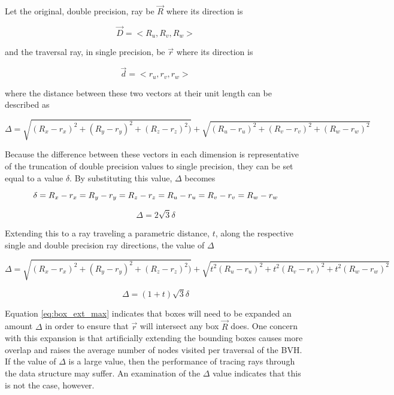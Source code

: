 Let the original, double precision, ray be $\vec{R}$ where its direction is

\begin{equation}
  \vec{D} = < R_{u}, R_{v}, R_{w} >
\end{equation}


and the traversal ray, in single precision, be $\vec{r}$ where its direction is

\begin{equation}
  \vec{d} = < r_{u}, r_{v}, r_{w} >
\end{equation}


where the distance between these two vectors at their unit length
can be described as

\begin{equation}
    \Delta = \sqrt{(R_{x} - r_{x})^{2} + (R_{y} - r_{y})^{2} + (R_{z} - r_{z})^{2})} + \sqrt{ (R_{u} - r_{u})^{2} + (R_{v} - r_{v})^{2} + (R_{w} -
    r_{w})^{2} }
\end{equation}

Because the difference between these vectors in each dimension is representative
of the truncation of double precision values to single precision, they can be
set equal to a value $\delta$. By substituting this value, $\Delta$ becomes

\begin{equation}
    \delta = R_{x} - r_{x} = R_{y} - r_{y} = R_{z} - r_{z} = \\ R_{u} - r_{u} = R_{v} - r_{v} = R_{w} -  r_{w}
\end{equation}

\begin{equation}
  \Delta = 2\sqrt{3}\delta
\end{equation}

Extending this to a ray traveling a parametric distance, $t$, along the
respective single and double precision ray directions, the value of $\Delta$

\begin{equation}
    \Delta = \sqrt{(R_{x} - r_{x})^{2} + (R_{y} - r_{y})^{2} + (R_{z} - r_{z})^{2})} + \sqrt{ t^{2}(R_{u} - r_{u})^{2} + t^{2}(R_{v} - r_{v})^{2} + t^{2}(R_{w} - r_{w})^{2} }
\end{equation}

\begin{equation}
  \Delta = (1 + t)\sqrt{3}\delta
  \label{eq:box_ext_max}
\end{equation}

Equation \eqref{eq:box_ext_max} indicates that boxes will need to be expanded an amount $\Delta$
in order to ensure that $\vec{r}$ will intersect any box $\vec{R}$ does. One
concern with this expansion is that artificially extending the bounding boxes
causes more overlap and raises the average number of nodes visited per traversal
of the BVH. If the value of $\Delta$ is a large value, then the performance of
tracing rays through the data structure may suffer. An examination of the
$\Delta$ value indicates that this is not the case, however.

